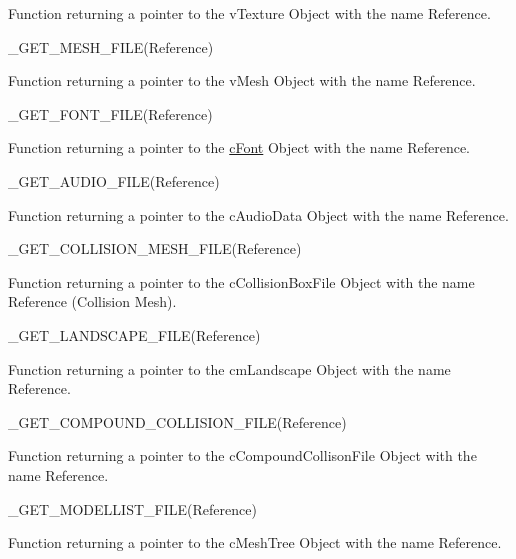 \begin{DoxyItemize}
\begin{DoxyItemize}
\item Function returning a pointer to the vTexture Object with the name Reference.
\end{DoxyItemize}
\item \_\-GET\_\-MESH\_\-FILE(Reference)
\begin{DoxyItemize}
\item Function returning a pointer to the vMesh Object with the name Reference.
\end{DoxyItemize}
\item \_\-GET\_\-FONT\_\-FILE(Reference)
\begin{DoxyItemize}
\item Function returning a pointer to the \hyperlink{classc_font}{cFont} Object with the name Reference.
\end{DoxyItemize}
\item \_\-GET\_\-AUDIO\_\-FILE(Reference)
\begin{DoxyItemize}
\item Function returning a pointer to the cAudioData Object with the name Reference.
\end{DoxyItemize}
\item \_\-GET\_\-COLLISION\_\-MESH\_\-FILE(Reference)
\begin{DoxyItemize}
\item Function returning a pointer to the cCollisionBoxFile Object with the name Reference (Collision Mesh).
\end{DoxyItemize}
\item \_\-GET\_\-LANDSCAPE\_\-FILE(Reference)
\begin{DoxyItemize}
\item Function returning a pointer to the cmLandscape Object with the name Reference.
\end{DoxyItemize}
\end{DoxyItemize}
\begin{DoxyItemize}
\item \_\-GET\_\-COMPOUND\_\-COLLISION\_\-FILE(Reference)
\begin{DoxyItemize}
\item Function returning a pointer to the cCompoundCollisonFile Object with the name Reference.
\end{DoxyItemize}
\end{DoxyItemize}
\begin{DoxyItemize}
\item \_\-GET\_\-MODELLIST\_\-FILE(Reference)
\begin{DoxyItemize}
\item Function returning a pointer to the cMeshTree Object with the name Reference.
\end{DoxyItemize}
\end{DoxyItemize}
